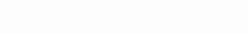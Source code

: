 \begin{tcolorbox}[colback=NordBackground, colframe=BraveOrange, title=\faYoutube \ Dica de Ouro para as Mães]
	\textcolor{white}{Se você quiser deixar a criança assistindo a desenhos no celular sem o risco de aparecerem propagandas no meio do vídeo, basta abrir o site do YouTube diretamente \textbf{dentro} do navegador Brave. A mágica acontece na hora!}
\end{tcolorbox}